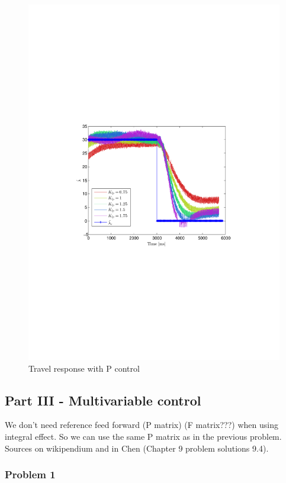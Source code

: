 \begin{figure}[!!ht!!!!!!!!tb!!]
	\centering
		\includegraphics[width=1\textwidth,trim={4cm 9cm 4cm 9cm},clip]{figures/P2p2_Klp.pdf}
	\caption{Travel response with P control}
\label{fig:P2p2_K_lp}
\end{figure}
\clearpage
\subsection{Part III - Multivariable control}



We don't need reference feed forward (P matrix) (F matrix???) when using integral effect. So we can use the same P matrix as in the previous problem. Sources on wikipendium and in Chen (Chapter 9 problem solutions 9.4).
\subsubsection{Problem 1}


